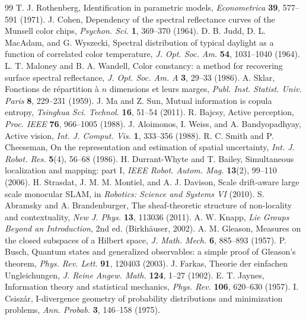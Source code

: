 \documentclass[11pt]{article}
\theoremstyle{boldplain}
\theoremstyle{boldupright}
\begin{document}
\begin{thebibliography}{99}
 T. J. Rothenberg, Identification in parametric models, \emph{Econometrica} \textbf{39}, 577--591 (1971).
 J. Cohen, Dependency of the spectral reflectance curves of the Munsell color chips, \emph{Psychon. Sci.} \textbf{1}, 369--370 (1964).
 D. B. Judd, D. L. MacAdam, and G. Wyszecki, Spectral distribution of typical daylight as a function of correlated color temperature, \emph{J. Opt. Soc. Am.} \textbf{54}, 1031--1040 (1964).
 L. T. Maloney and B. A. Wandell, Color constancy: a method for recovering surface spectral reflectance, \emph{J. Opt. Soc. Am. A} \textbf{3}, 29--33 (1986).
 A. Sklar, Fonctions de r\'epartition \`a $n$ dimensions et leurs marges, \emph{Publ. Inst. Statist. Univ. Paris} \textbf{8}, 229--231 (1959).
 J. Ma and Z. Sun, Mutual information is copula entropy, \emph{Tsinghua Sci. Technol.} \textbf{16}, 51--54 (2011).
 R. Bajcsy, Active perception, \emph{Proc. IEEE} \textbf{76}, 966--1005 (1988).
 J. Aloimonos, I. Weiss, and A. Bandyopadhyay, Active vision, \emph{Int. J. Comput. Vis.} \textbf{1}, 333--356 (1988).
 R. C. Smith and P. Cheeseman, On the representation and estimation of spatial uncertainty, \emph{Int. J. Robot. Res.} \textbf{5}(4), 56--68 (1986).
 H. Durrant-Whyte and T. Bailey, Simultaneous localization and mapping: part I, \emph{IEEE Robot. Autom. Mag.} \textbf{13}(2), 99--110 (2006).
 H. Strasdat, J. M. M. Montiel, and A. J. Davison, Scale drift-aware large scale monocular SLAM, in \emph{Robotics: Science and Systems VI} (2010).
 S. Abramsky and A. Brandenburger, The sheaf-theoretic structure of non-locality and contextuality, \emph{New J. Phys.} \textbf{13}, 113036 (2011).
 A. W. Knapp, \emph{Lie Groups Beyond an Introduction}, 2nd ed. (Birkh\"auser, 2002).
 A. M. Gleason, Measures on the closed subspaces of a Hilbert space, \emph{J. Math. Mech.} \textbf{6}, 885--893 (1957).
 P. Busch, Quantum states and generalized observables: a simple proof of Gleason's theorem, \emph{Phys. Rev. Lett.} \textbf{91}, 120403 (2003).
 J. Farkas, Theorie der einfachen Ungleichungen, \emph{J. Reine Angew. Math.} \textbf{124}, 1--27 (1902).
 E. T. Jaynes, Information theory and statistical mechanics, \emph{Phys. Rev.} \textbf{106}, 620--630 (1957).
 I. Csisz\'ar, I-divergence geometry of probability distributions and minimization problems, \emph{Ann. Probab.} \textbf{3}, 146--158 (1975).

\end{thebibliography}
\end{document}
